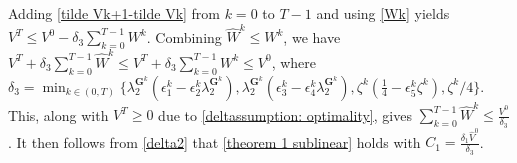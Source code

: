 \documentclass[12pt,draftcls,onecolumn]{IEEEtran}
\begin{document}
Adding \eqref{tilde Vk+1-tilde Vk} from $k=0$ to $T-1$ and using \eqref{Wk} yields $V^{T} \leq V^0 - \delta_3 \sum_{k=0}^{T-1} W^k$. 
Combining $\hat{W}^k\leq W^k$, we have $V^{T} + \delta_3 \sum_{k=0}^{T-1} \hat{W}^k\leq V^{T} + \delta_3 \sum_{k=0}^{T-1} W^k \leq V^0$, where $\delta_3  = \min_{k\in(0,T)} \{\lambda_{2}^{\mathbf{G}^k}({\epsilon_1^k} - {\epsilon_2^k} \lambda_{2}^{\mathbf{G}^k}),\lambda_{2}^{\mathbf{G}^k}({\epsilon_3^k} - \epsilon_4^k \lambda_{2}^{\mathbf{G}^k}),{\zeta^k}(\frac{1}{4} - {\epsilon_{5}^k} {\zeta^k}),{\zeta^k}/4 \}.$
This, along with $V^{T}\geq 0$ due to \eqref{deltassumption: optimality}, gives $\sum_{k=0}^{T-1} \hat{W}^{k}\leq \frac{V^0}{\delta_3}$. It then follows from \eqref{delta2} that \eqref{theorem 1 sublinear} holds with $C_1 = \frac{{\delta_1} \hat{V}^0}{\delta_3 }$.

\end{document}
